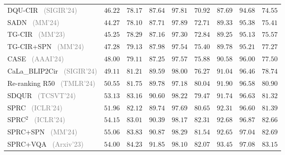 \begin{table*}
\begin{tabular}{l|cccc|ccc|c}
    DQU-CIR~\cite{wen2024dqu} \footnotesize{\textcolor{gray}{(SIGIR'24)}} & $46.22$ & $78.17$ & $87.64$ & $97.81$ & $70.92$ & $87.69$ & $94.68$ & $74.55$ \\
    SADN~\cite{wang2024sadn} \footnotesize{\textcolor{gray}{(MM'24)}} & $44.27$ & $78.10$ & $87.71$ & $97.89$ & $72.71$ & $89.33$ & $95.38$ & $75.41$ \\
    TG-CIR~\cite{wen2023tgcir} \footnotesize{\textcolor{gray}{(MM'23)}} & $45.25$ & $78.29$ & $87.16$ & $97.30$ & $72.84$ & $89.25$ & $95.13$ & $75.57$ \\
    TG-CIR+SPN~\cite{feng2024spn} \footnotesize{\textcolor{gray}{(MM'24)}} & $47.28$ & $79.13$ & $87.98$ & $97.54$ & $75.40$ & $89.78$ & $95.21$ & $77.27$ \\
    CASE~\cite{levy2024case} \footnotesize{\textcolor{gray}{(AAAI'24)}} & $48.00$ & $79.11$ & $87.25$ & $97.57$ & $75.88$ & $90.58$ & $96.00$ & $77.50$ \\
    CaLa_BLIP2Cir~\cite{feng2024spn} \footnotesize{\textcolor{gray}{(SIGIR'24)}} & $49.11$ & $81.21$ & $89.59$ & $98.00$ & $76.27$ & $91.04$ & $96.46$ & $78.74$ \\
    Re-ranking R50~\cite{liu2023rerank} \footnotesize{\textcolor{gray}{(TMLR'24)}} & $50.55$ & $81.75$ & $89.78$ & $97.18$ & $80.04$ & $91.90$ & $96.58$ & $80.90$ \\
    SDQUR~\cite{xu2024SDQUR} \footnotesize{\textcolor{gray}{(TCSVT'24)}} & $53.13$ & $83.16$ & $90.60$ & $98.22$ & $79.47$ & $91.74$ & $96.63$ & $81.32$ \\
    SPRC~\cite{xusentence2024sprc} \footnotesize{\textcolor{gray}{(ICLR'24)}} & $51.96$ & $82.12$ & $89.74$ & $97.69$ & $80.65$ & $92.31$ & $96.60$ & $81.39$ \\
    SPRC$^2$~\cite{xusentence2024sprc} \footnotesize{\textcolor{gray}{(ICLR'24)}} & $54.15$ & $83.01$ & $90.39$ & $98.17$ & $82.31$ & $92.68$ & $96.87$ & $82.66$ \\
    SPRC+SPN~\cite{feng2024spn} \footnotesize{\textcolor{gray}{(MM'24)}} & $55.06$ & $83.83$ & $90.87$ & $98.29$ & $81.54$ & $92.65$ & $97.04$ & $82.69$ \\
    SPRC+VQA~\cite{feng2023vqa4cir} \footnotesize{\textcolor{gray}{(Arxiv'23)}} & $54.00$ & $84.23$ & $91.85$ & $98.10$ & $82.07$ & $93.45$ & $97.08$ & $83.15$ \\
    
    \hline
    \end{tabular}
    \label{tab:supervised_CIR_exp_cirr}
\end{table*}


